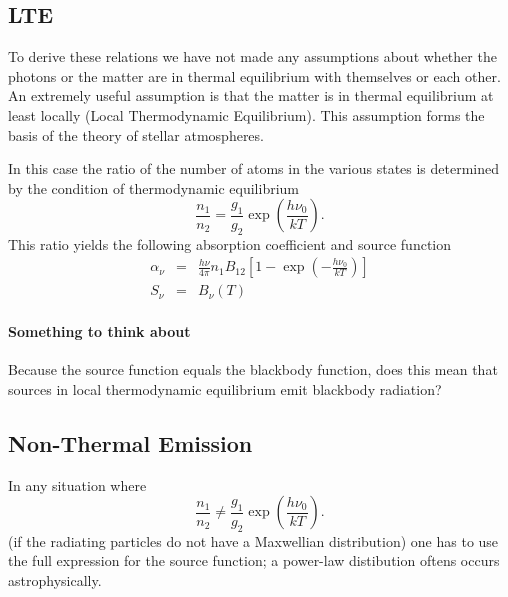 \subsection{LTE}
\label{sec:lte}
To derive these relations we have not made any assumptions about
whether the photons or the matter are in thermal equilibrium with
themselves or each other.  An extremely useful assumption is that the
matter is in thermal equilibrium at least locally (Local Thermodynamic
Equilibrium).  This assumption forms the basis of the theory of stellar
atmospheres.

In this case the ratio of the number of atoms in the various states is
determined by the condition of thermodynamic equilibrium
\begin{equation}
\frac{n_1}{n_2} = \frac{g_1}{g_2} \exp \left (\frac{h\nu_0}{kT}\right).
\label{eq:79}
\end{equation}
This ratio yields the following absorption coefficient and source
function
\begin{eqnarray}
\label{eq:80}
\alpha_\nu &=& \frac{h\nu}{4\pi} n_1 B_{12} \left [ 1 - \exp
\left (-\frac{h\nu_0}{kT} \right ) \right] \\
S_\nu &=& B_\nu(T)
\label{eq:81}
\end{eqnarray}

\paragraph{Something to think about}  Because the source function
equals the blackbody function, does this mean that sources in local
thermodynamic equilibrium emit blackbody radiation?

\subsection{Non-Thermal Emission}
\label{sec:non-thermal-emission}
In any situation where 
\begin{equation}
\frac{n_1}{n_2} \neq \frac{g_1}{g_2} \exp \left (\frac{h\nu_0}{kT}\right).
\label{eq:82}
\end{equation}
(\ie if the radiating particles do not have a Maxwellian distribution)
one has to use the full expression for the source function; a
power-law distibution oftens occurs astrophysically.

